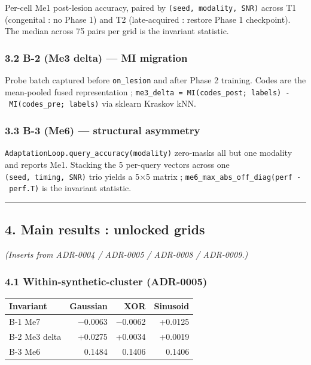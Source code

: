 \documentclass[
]{article}
\newcounter{none} %
\begin{document}
Per-cell Me1 post-lesion accuracy, paired by
\texttt{(seed,\ modality,\ SNR)} across T1 (congenital : no Phase 1) and
T2 (late-acquired : restore Phase 1 checkpoint). The median across 75
pairs per grid is the invariant statistic.

\subsubsection{3.2 B-2 (Me3 delta) --- MI
migration}\label{32-b-2-me3-delta--mi-migration}

Probe batch captured before \texttt{on\_lesion} and after Phase 2
training. Codes are the mean-pooled fused representation ;
\texttt{me3\_delta\ =\ MI(codes\_post;\ labels)\ -\ MI(codes\_pre;\ labels)}
via sklearn Kraskov kNN.

\subsubsection{3.3 B-3 (Me6) --- structural
asymmetry}\label{33-b-3-me6--structural-asymmetry}

\texttt{AdaptationLoop.query\_accuracy(modality)} zero-masks all but one
modality and reports Me1. Stacking the 5 per-query vectors across one
\texttt{(seed,\ timing,\ SNR)} trio yields a 5×5 matrix ;
\texttt{me6\_max\_abs\_off\_diag(perf\ -\ perf.T)} is the invariant
statistic.

\begin{center}\rule{0.5\linewidth}{0.5pt}\end{center}

\subsection{4. Main results : unlocked
grids}\label{4-main-results--unlocked-grids}

\emph{(Inserts from ADR-0004 / ADR-0005 / ADR-0008 / ADR-0009.)}

\subsubsection{4.1 Within-synthetic-cluster
(ADR-0005)}\label{41-within-synthetic-cluster-adr-0005}

{\def\LTcaptype{none} %
\begin{longtable}[]{@{}lrrr@{}}
\toprule\noalign{}
Invariant & Gaussian & XOR & Sinusoid \\
\midrule\noalign{}
\endhead
\bottomrule\noalign{}
\endlastfoot
B-1 Me7 & −0.0063 & −0.0062 & +0.0125 \\
B-2 Me3 delta & +0.0275 & +0.0034 & +0.0019 \\
B-3 Me6 & 0.1484 & 0.1406 & 0.1406 \\
\end{longtable}
}
\end{document}
